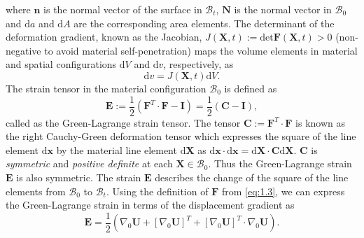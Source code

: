 \documentclass[11pt,a4paper,final]{article}
\begin{document}
where $\mathbf{n}$ is the normal vector of the surface in $\mathcal{B}_t$, $\mathbf{N}$ is the normal vector in $\mathcal{B}_0$ and $\mathrm{d}a$ and $\mathrm{d}A$ are the corresponding area elements. The determinant of the deformation gradient, known as the Jacobian, $J(\mathbf{X}, t) := \text{det} \mathbf{F}(\mathbf{X}, t) > 0$ (non-negative to avoid material self-penetration) maps the volume elements in material and spatial configurations $\mathrm{d}V$ and $\mathrm{d}v$, respectively, as 
\begin{equation}
\mathrm{d}v = J(\mathbf{X}, t) \mathrm{d}V.
\end{equation} 
The strain tensor in the material configuration $\mathcal{B}_0$ is defined as
\begin{equation}
\mathbf{E} := \frac{1}{2} (\mathbf{F}^T \cdot \mathbf{F} - \mathbf{I}) = \frac{1}{2} (\mathbf{C} - \mathbf{I}),
\end{equation}
called as the Green-Lagrange strain tensor. The tensor $\mathbf{C}:= \mathbf{F}^T \cdot \mathbf{F}$ is known as the right Cauchy-Green deformation tensor which expresses the square of the line element $\bm{\mathrm{d}}\mathbf{x}$ by the material line element $\bm{\mathrm{d}}\mathbf{X}$ as $\bm{\mathrm{d}}\mathbf{x} \cdot \bm{\mathrm{d}}\mathbf{x} = \bm{\mathrm{d}}\mathbf{X} \cdot \mathbf{C} \bm{\mathrm{d}}\mathbf{X}$. $\mathbf{C}$ is \textit{symmetric} and \textit{positive definite} at each $\mathbf{X} \in \mathcal{B}_0$. Thus the Green-Lagrange strain $\mathbf{E}$ is also symmetric. The strain $\mathbf{E}$ describes the change of the square of the line elements from $\mathcal{B}_0$ to $\mathcal{B}_t$. Using the definition of $\mathbf{F}$ from \eqref{eq:1.3}, we can express the Green-Lagrange strain in terms of the displacement gradient as 
\begin{equation}
\mathbf{E} = \frac{1}{2} ( \nabla_0 \mathbf{U} + [\nabla_0 \mathbf{U}]^T + [\nabla_0 \mathbf{U}]^T \cdot \nabla_0 \mathbf{U} ).
\end{equation}
\end{document}
